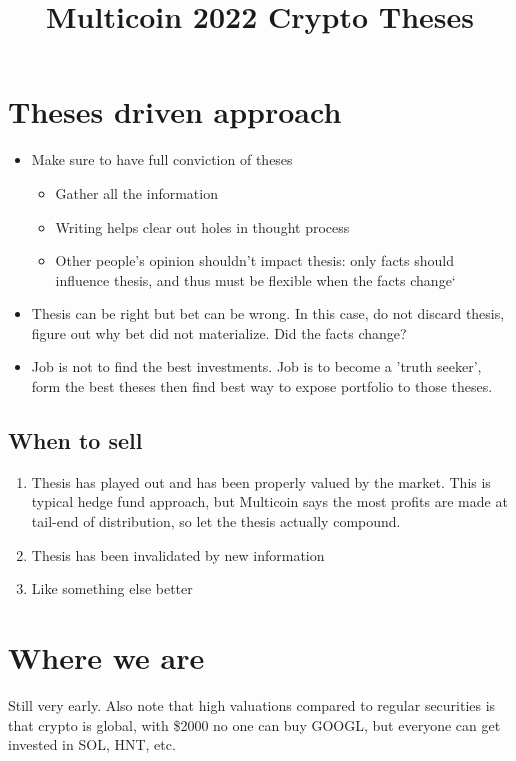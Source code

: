 \documentclass{../notes}
\title{Multicoin 2022 Crypto Theses}
\begin{document}
\maketitle

\section{Theses driven approach}
\begin{itemize}
    \item Make sure to have full conviction of theses
        \begin{itemize}
            \item Gather all the information
            \item Writing helps clear out holes in thought process
            \item Other people's opinion shouldn't impact thesis: only facts should influence thesis, and thus must be flexible when the facts change`
        \end{itemize}
    \item Thesis can be right but bet can be wrong. In this case, do not discard thesis, figure out why bet did not materialize. Did the facts change? 
    \item Job is not to find the best investments. Job is to become a 'truth seeker', form the best theses then find best way to expose portfolio to those theses. 
\end{itemize}

\subsection{When to sell}
\begin{enumerate}
    \item Thesis has played out and has been properly valued by the market. This is typical hedge fund approach, but Multicoin says the most profits are made at tail-end of distribution, so let the thesis actually compound. 
    \item Thesis has been invalidated by new information
    \item Like something else better
\end{enumerate}

\section{Where we are}
Still very early. Also note that high valuations compared to regular securities is that crypto is global, with \$2000 no one can buy GOOGL, but everyone can get invested in SOL, HNT, etc. 
\end{document}
